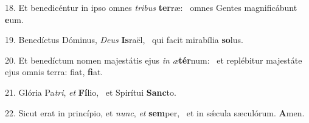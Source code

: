 18. Et benedicéntur in ipso omnes \textit{tri}\textit{bus} \textbf{ter}ræ: \ast\  omnes Gentes magnificábunt \textbf{e}um.\

19. Benedíctus Dóminus, \textit{De}\textit{us} \textbf{Is}raël, \ast\  qui facit mirabília \textbf{so}lus.\

20. Et benedíctum nomen majestátis ejus \textit{in} \textit{æ}\textbf{tér}num: \ast\  et replébitur majestáte ejus omnis terra: fiat, \textbf{fi}at.\

21. Glória Pa\textit{tri}, \textit{et} \textbf{Fí}lio, \ast\  et Spirítui \textbf{Sanc}to.\

22. Sicut erat in princípio, et \textit{nunc}, \textit{et} \textbf{sem}per, \ast\  et in sǽcula sæculórum. \textbf{A}men.\

